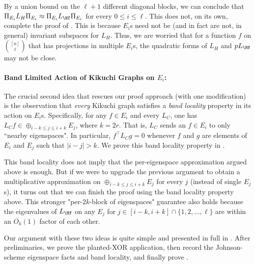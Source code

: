 \documentclass
[11pt,letterpaper]
{article}
\begin{document}
By a union bound on the $\ell+1$ different diagonal blocks, we can conclude that $\Pi_{E_i} L_H \Pi_{E_i} \approx \Pi_{E_i} L_{\Hf} \Pi_{E_i}$ for every $0 \leq i \leq \ell$. This does not, on its own, complete the proof of . This is because $E_i$s need not be (and in fact are not, in general) invariant subspaces for $L_{H}$. Thus, we are worried that for a function $f$ on ${[n] \choose \ell}$ that has projections in multiple $E_i$s, the quadratic forms of $L_H$ and $p L_{\Hf}$ may not be close.  

\paragraph{Band Limited Action of Kikuchi Graphs on $E_i$:} The crucial second idea that rescues our proof approach (with one modification) is the observation that \emph{every} Kikuchi graph satisfies a \emph{band locality} property in its action on $E_i$s. Specifically, for any $f \in E_i$ and every $L_C$, one has $L_C f \in \oplus_{i-k \leq j \leq i+k} E_j$, where $k=2r$. That is, $L_C$ sends an $f \in E_i$ to only ``nearby eigenspaces". In particular, $f^{\top} L_C g = 0$ whenever $f$ and $g$ are elements of $E_i$ and $E_j$ such that $|i-j|>k$. We prove this band locality property in .

This band locality does not imply that the per-eigenspace approximation argued above is enough. But if we were to upgrade the previous argument to obtain a multiplicative approximation on $\oplus_{i-k \leq j \leq i+k} E_j$ for every $j$ (instead of single $E_j$s), it turns out that we can finish the proof using the band locality property above. This stronger "per-$2k$-block of eigenspaces" guarantee also holds because the eigenvalues of $L_{\Hf}$ on any $E_j$ for $j \in [i-k,i+k] \cap \{1,2,\ldots,\ell\}$ are within an $O_k(1)$ factor of each other.  

Our argument with these two ideas is quite simple and presented in full in . 
After preliminaries, we prove the planted-XOR application, then record the Johnson-scheme eigenspace facts and band locality, and finally prove .

\end{document}
